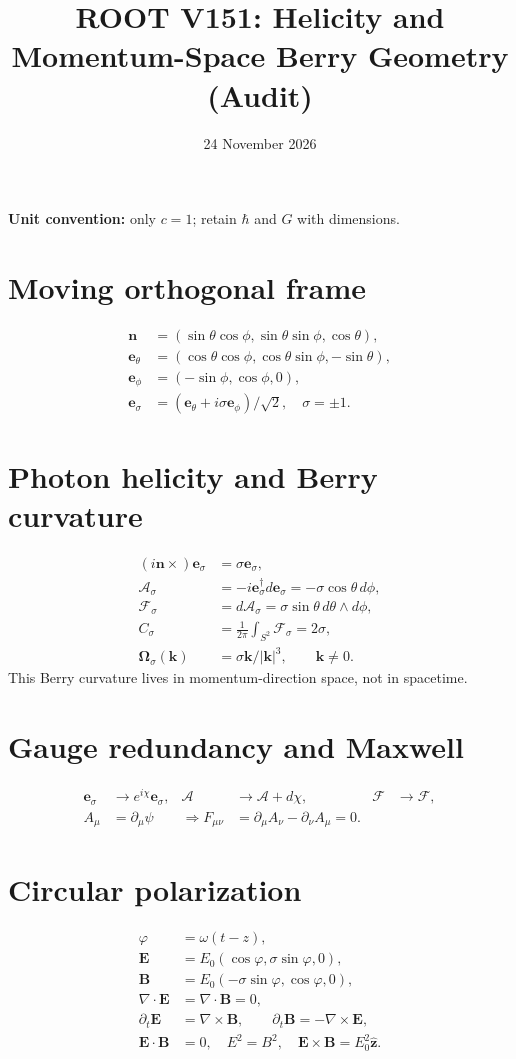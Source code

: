 \documentclass[11pt]{article}
\title{ROOT V151: Helicity and Momentum-Space Berry Geometry (Audit)}
\date{24 November 2026}
\begin{document}
\maketitle
\noindent\textbf{Unit convention:} only $c=1$; retain $\hbar$ and $G$ with dimensions.
\section*{Moving orthogonal frame}
\begin{align}
\mathbf n&=(\sin\theta\cos\phi,\sin\theta\sin\phi,\cos\theta),\\
\mathbf e_\theta&=(\cos\theta\cos\phi,\cos\theta\sin\phi,-\sin\theta),\\
\mathbf e_\phi&=(-\sin\phi,\cos\phi,0),\\
\mathbf e_\sigma&=(\mathbf e_\theta+i\sigma\mathbf e_\phi)/\sqrt2,\quad \sigma=\pm1.
\end{align}
\section*{Photon helicity and Berry curvature}
\begin{align}
(i\mathbf n\times)\mathbf e_\sigma&=\sigma\mathbf e_\sigma,\\
\mathcal A_\sigma&=-i\mathbf e_\sigma^\dagger d\mathbf e_\sigma=-\sigma\cos\theta\,d\phi,\\
\mathcal F_\sigma&=d\mathcal A_\sigma=\sigma\sin\theta\,d\theta\wedge d\phi,\\
C_\sigma&=\frac{1}{2\pi}\int_{S^2}\mathcal F_\sigma=2\sigma,\\
\boldsymbol\Omega_\sigma(\mathbf k)&=\sigma\mathbf k/|\mathbf k|^3,\qquad\mathbf k\ne0.
\end{align}
\noindent This Berry curvature lives in momentum-direction space, not in spacetime.
\section*{Gauge redundancy and Maxwell}
\begin{align}
\mathbf e_\sigma &\to e^{i\chi}\mathbf e_\sigma, &\mathcal A&\to\mathcal A+d\chi,
&\mathcal F&\to\mathcal F,\\
A_\mu&=\partial_\mu\psi &\Rightarrow F_{\mu\nu}&=\partial_\mu A_\nu-\partial_\nu A_\mu=0.
\end{align}
\section*{Circular polarization}
\begin{align}
\varphi&=\omega(t-z),\\
\mathbf E&=E_0(\cos\varphi,\sigma\sin\varphi,0),\\
\mathbf B&=E_0(-\sigma\sin\varphi,\cos\varphi,0),\\
\nabla\cdot\mathbf E&=\nabla\cdot\mathbf B=0,\\
\partial_t\mathbf E&=\nabla\times\mathbf B,\qquad \partial_t\mathbf B=-\nabla\times\mathbf E,\\
\mathbf E\cdot\mathbf B&=0,\quad E^2=B^2,\quad\mathbf E\times\mathbf B=E_0^2\hat{\mathbf z}.
\end{align}
\end{document}
